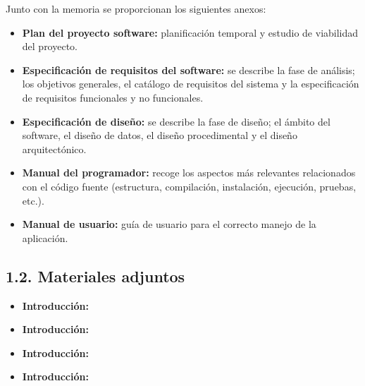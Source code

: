 Junto con la memoria se proporcionan los siguientes anexos:
\begin{itemize}
	\item \textbf{Plan del proyecto software:} planificación temporal y estudio de viabilidad del proyecto.
	\item \textbf{Especificación de requisitos del software:} se describe la fase de análisis; los objetivos generales, el catálogo de requisitos del sistema y la especificación de requisitos funcionales y no funcionales.
	\item \textbf{Especificación de diseño:} se describe la fase de diseño; el ámbito
del software, el diseño de datos, el diseño procedimental y el diseño arquitectónico.
	\item \textbf{Manual del programador:} recoge los aspectos más relevantes relacionados
con el código fuente (estructura, compilación, instalación, ejecución, pruebas, etc.).
	\item \textbf{Manual de usuario:} guía de usuario para el correcto manejo de la
aplicación.
\end{itemize}


\subsection{1.2. Materiales adjuntos}
\begin{itemize}
	\item \textbf{Introducción:} 
	\item \textbf{Introducción:} 
	\item \textbf{Introducción:} 
	\item \textbf{Introducción:} 
\end{itemize}
